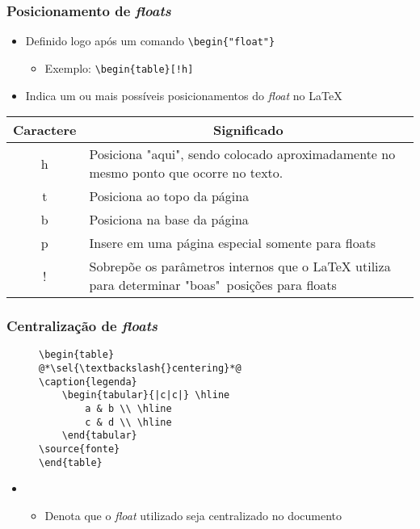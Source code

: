 \begin{frame}[fragile] \frametitle{Posicionamento de \textit{floats}}
\begin{itemize}
	\item Definido logo após um comando \texttt{\textbackslash{}begin\{"float"\}}
	\begin{itemize}
		\item Exemplo: \texttt{\textbackslash{}begin\{table\}[!h]}
	\end{itemize}
	\item Indica um ou mais possíveis posicionamentos do \textit{float} no LaTeX
\end{itemize}

\begin{table}[!t]
\label{tab:posicaofloats}
\begin{tabular}{c|p{7.5cm}} \hline
\textbf{Caractere} & \multicolumn{1}{c}{\textbf{Significado}} \\ \hline
h & Posiciona "aqui", sendo colocado aproximadamente no mesmo ponto que ocorre no texto.            \\ \hline
t & Posiciona ao topo da página             \\ \hline
b & Posiciona na base da página             \\ \hline
p & Insere em uma página especial somente para floats     \\ \hline
! & Sobrepõe os parâmetros internos que o LaTeX utiliza para determinar "boas"~posições para floats \\ \hline
\end{tabular}
\end{table}
\end{frame}

\begin{frame}[fragile,label={slide:floatcentering}] \frametitle{Centralização de \textit{floats}}
\vspace{-0.5cm}
\begin{figure}[!t]
\begin{lstlisting}
\begin{table}
@*\sel{\textbackslash{}centering}*@
\caption{legenda}
	\begin{tabular}{|c|c|} \hline
		a & b \\ \hline
		c & d \\ \hline
	\end{tabular}
\source{fonte}
\end{table}
\end{lstlisting}
\end{figure}

\begin{itemize}
	\item {}
	\begin{itemize}
		\item Denota que o \textit{float} utilizado seja centralizado no documento
	\end{itemize}
\end{itemize}
\end{frame}


